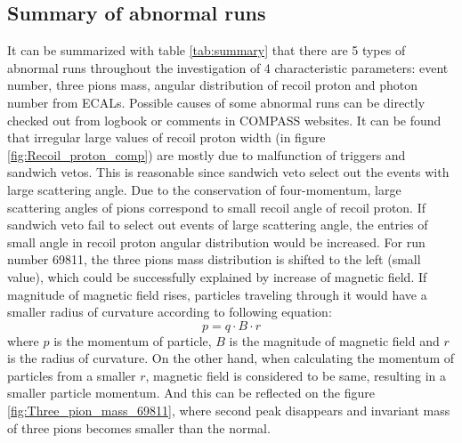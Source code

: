 \subsection{Summary of abnormal runs}
It can be summarized with table \ref{tab:summary} that there are 5 types of abnormal runs throughout the investigation of 4 characteristic parameters: event number, three pions mass, angular distribution of recoil proton and photon number from ECALs. Possible causes of some abnormal runs can be directly checked out from logbook or comments in COMPASS websites. It can be found that irregular large values of recoil proton width (in figure \ref{fig:Recoil_proton_comp}) are mostly due to malfunction of triggers and sandwich vetos. This is reasonable since sandwich veto select out the events with large scattering angle. Due to the conservation of four-momentum, large scattering angles of pions correspond to small recoil angle of recoil proton. If sandwich veto fail to select out events of large scattering angle, the entries of small angle in recoil proton angular distribution would be increased. For run number 69811, the three pions mass distribution is shifted to the left (small value), which could be successfully explained by increase of magnetic field. If magnitude of magnetic field rises, particles traveling through it would have a smaller radius of curvature according to following equation:
\begin{equation}
p = q\cdot B\cdot r
\end{equation}
where $p$ is the momentum of particle, $B$ is the magnitude of magnetic field and $r$ is the radius of curvature. On the other hand, when calculating the momentum of particles from a smaller $r$, magnetic field is considered to be same, resulting in a smaller particle momentum. And this can be reflected on the figure \ref{fig:Three_pion_mass_69811}, where second peak disappears and invariant mass of three pions becomes smaller than the normal.
